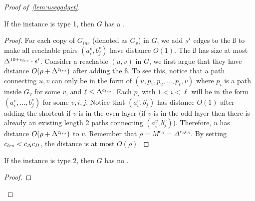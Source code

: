 \begin{proof}[Proof of~\cref{lem:usegadget}]
\begin{lemma}\label{lem:type1}
	If the \gadget{\cs{}}{\epsilon} instance is type 1, then $G$ has a .
\end{lemma}
\begin{proof}
	For each copy of $G_{inr}$ (denoted as $G_v$) in $G$, we add ${s'}$ edges to the \ss{} to make all reachable pairs $(a^v_{i},b^v_j)$ have distance $O(1)$. The \ss{} has size at most $\Delta^{10+{c_{lrs}}}\cdot {s'}$. Consider a reachable $(u,v)$ in $G$, we first argue that they have distance $O(\rho{}+\Delta^{c_{lrs}})$ after adding the \ss{}. To see this, notice that a path connecting $u,v$ can only be in the form of $(u,p_1,p_2,...,p_{\ell},v)$ where $p_i$ is a path inside $G_v$ for some $v$, and $\ell\le\Delta^{{c_{lrs}}}$. %
	Each $p_i$ with $1<i<\ell$ will be in the form $(a^v_i,...,b^v_j)$ for some $v,i,j$. Notice that $(a^v_i,b^v_j)$ has distance $O(1)$ after adding the shortcut if $v$ is in the even layer (if $v$ is in the odd layer then there is already an existing length 2 paths connecting $(a^v_i,b^v_j)$). Therefore, $u$ has distance $O(\rho{}+\Delta^{c_{lrs}})$ to $v$. Remember that $\rho{}=M^{c_D}=\Delta^{c_\Delta c_D}$. By setting ${c_{lrs}}{}<c_\Delta c_D$, the distance is at most $O(\rho{})$.
\end{proof}


\begin{lemma}\label{lem:type2}
	If the \gadget{\cs{}}{\epsilon} instance is type 2, then $G$ has no .
\end{lemma}
\begin{proof}
	

\end{proof}
\end{proof}
